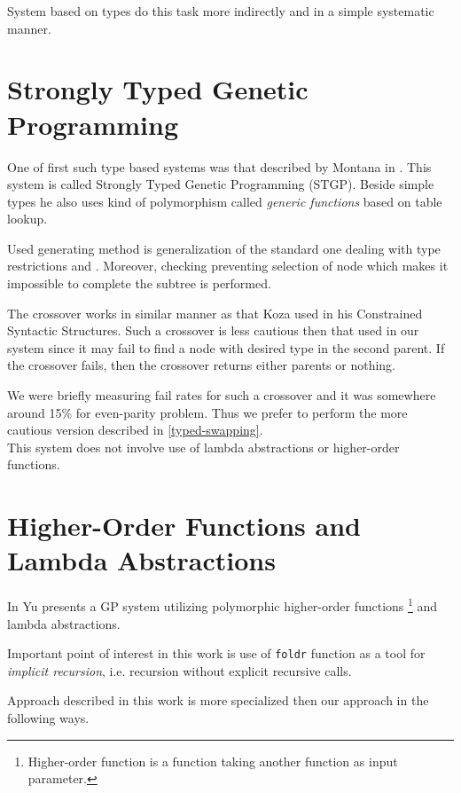 \documentclass[12pt,a4paper]{report}
\begin{document}
System based on types do this task more indirectly and in a
simple systematic manner.

\section{Strongly Typed Genetic Programming}
One of first such type based systems was that described by Montana
in \cite{montana95}. This system is called 
Strongly Typed Genetic Programming (STGP).
Beside simple types he also uses kind of polymorphism 
called \textit{generic functions} based on table lookup.

Used generating method is generalization of the standard one
dealing with type restrictions and . Moreover, checking preventing
selection of node which makes it impossible to complete the subtree 
is performed.

The crossover works in similar manner as that Koza used
in his Constrained Syntactic Structures. Such a crossover
is less cautious then that used in our system
since it may fail to find a node with desired type in the second parent.
If the crossover fails, then the crossover returns either parents or nothing.

We were briefly measuring fail rates for such a crossover and
it was somewhere around 15\% for even-parity problem. Thus we prefer
to perform the more cautious version described in \ref{typed-swapping}.  \\

This system does not involve use of lambda abstractions or
higher-order functions.

\section{Higher-Order Functions and Lambda Abstractions} 
In \cite{yu01} Yu presents a GP system utilizing
polymorphic higher-order functions 
\footnote{Higher-order function is a function taking another function as 
input parameter.} and lambda abstractions.

Important point of interest in this work is use of
\texttt{foldr} function as a tool for \textit{implicit recursion},
i.e. recursion without explicit recursive calls. 

Approach described in this work is more specialized then our approach
in the following ways.
\end{document}
